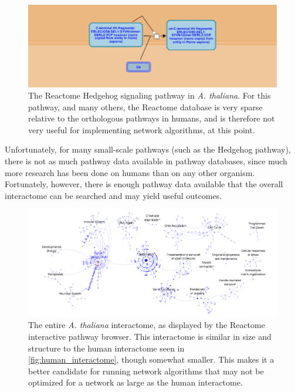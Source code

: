 \documentclass[12pt,twoside]{reedthesis}
\theoremstyle{definition}
\begin{document}
   \begin{figure}[h]
     \begin{center}
       \includegraphics[width=\textwidth]{at_hh}
     \caption[\textit{Arabidopsis thaliana} Hedgehog pathway]{The Reactome Hedgehog signaling pathway in \textit{A. thaliana}. For this pathway, and many others, the Reactome database is very sparse relative to the orthologous pathways in humans, and is therefore not very useful for implementing network algorithms, at this point.}
     \label{fig:at_hh}
     \end{center}
   \end{figure}

   Unfortunately, for many small-scale pathways (such as the Hedgehog pathway), there is not as much pathway data available in pathway databases, since much more research has been done on humans than on any other organism. Fortunately, however, there is enough pathway data available that the overall interactome can be searched and may yield useful outcomes.\par

   \begin{figure}[h]
     \begin{center}
       \includegraphics[width=\textwidth]{at_interactome}
     \caption[\textit{Arabidopsis thaliana} interactome]{The entire \textit{A. thaliana}  interactome, as displayed by the Reactome interactive pathway browser. This interactome is similar in size and structure to the human interactome seen in \ref{fig:human_interactome}, though somewhat smaller. This makes it a better candidate for running network algorithms that may not be optimized for a network as large as the human interactome.}
     \label{fig:at_interactome}
     \end{center}
   \end{figure}
\end{document}
